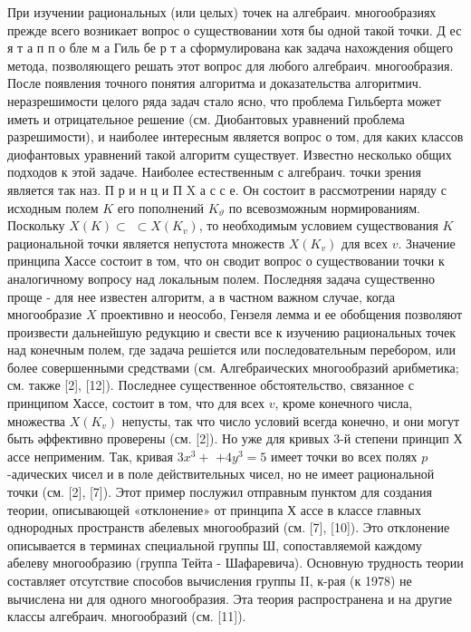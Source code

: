 \documentclass[10pt]{article}
\begin{document}
При изучении рациональных (или целых) точек на алгебраич. многообразиях прежде всего возникает вопрос о существовании хотя бы одной такой точки. Д ес я т а п п о бле м а Гиль бе р т а сформулирована как задача нахождения общего метода, позволяющего решать этот вопрос для любого алгебраич. многообразия. После появления точного понятия алгоритма и доказательства алгоритмич. неразрешимости целого ряда задач стало ясно, что проблема Гильберта может иметь и отрицательное решение (см. Диобантовых уравнений проблема разрешимости), и наиболее интересным является вопрос о том, для каких классов диофантовых уравнений такой алгоритм существует. Известно несколько общих подходов к этой задаче. Наиболее естественным с алгебраич. точки зрения является так наз. П р и н ц и П $\mathrm{X}$ а с с е. Он состоит в рассмотрении наряду с исходным полем $K$ его пополнений $K_{\vartheta}$ по всевозможным нормированиям. Поскольку $X(K) \subset$ $\subset X\left(K_{v}\right)$, то необходимым условием существования $K$ рациональной точки является непустота множеств $X\left(K_{v}\right)$ для всех $v$. Значение принципа Хассе состоит в том, что он сводит вопрос о существовании точки к аналогичному вопросу над локальным полем. Последняя задача существенно проще - для нее известен алгоритм, а в частном важном случае, когда многообразие $X$ проективно и неособо, Гензеля лемма и ее обобщения позволяют произвести дальнейшую редукцию и свести все к изучению рациональных точек над конечным полем, где задача решіется или последовательным перебором, или более совершенными средствами (см. Алгебраических многообразий арибметика; см. также [2], [12]). Последнее существенное обстоятельство, связанное с принципом Хассе, состоит в том, что для всех $v$, кроме конечного числа, множества $X\left(K_{v}\right)$ непусты, так что число условий всегда конечно, и они могут быть әффективно проверены (см. [2]). Но уже для кривых 3-й степени принцип Х ассе неприменим. Так, кривая $3 x^{3}+$ $+4 y^{3}=5$ имеет точки во всех полях $p$-адических чисел и в поле действительных чисел, но не имеет рациональной точки (см. [2], [7]). Этот пример послужил отправным пунктом для создания теории, описывающей «отклонение» от принципа Х ассе в классе главных однородных пространств абелевых многообразий (см. [7], [10]). Это отклонение описывается в терминах специальной группы Ш, сопоставляемой каждому абелеву многообразию (группа Тейта - Шафаревича). Основную трудность теории составляет отсутствие способов вычисления группы II, к-рая (к 1978) не вычислена ни для одного многообразия. Эта теория распространена и на другие классы алгебраич. многообразий (см. [11]).
\end{document}
